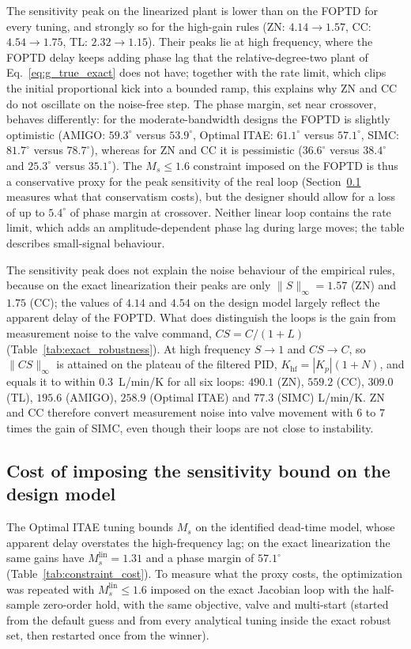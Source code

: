 The sensitivity peak on the linearized plant is lower than on the FOPTD for every tuning, and strongly so for the high-gain rules (ZN: $4.14 \rightarrow 1.57$, CC: $4.54 \rightarrow 1.75$, TL: $2.32 \rightarrow 1.15$). Their peaks lie at high frequency, where the FOPTD delay keeps adding phase lag that the relative-degree-two plant of Eq.~\eqref{eq:g_true_exact} does not have; together with the rate limit, which clips the initial proportional kick into a bounded ramp, this explains why ZN and CC do not oscillate on the noise-free step. The phase margin, set near crossover, behaves differently: for the moderate-bandwidth designs the FOPTD is slightly optimistic (AMIGO: $59.3^\circ$ versus $53.9^\circ$, Optimal ITAE: $61.1^\circ$ versus $57.1^\circ$, SIMC: $81.7^\circ$ versus $78.7^\circ$), whereas for ZN and CC it is pessimistic ($36.6^\circ$ versus $38.4^\circ$ and $25.3^\circ$ versus $35.1^\circ$). The $M_s \le 1.6$ constraint imposed on the FOPTD is thus a conservative proxy for the peak sensitivity of the real loop (Section~\ref{subsec:constraint_cost} measures what that conservatism costs), but the designer should allow for a loss of up to $5.4^\circ$ of phase margin at crossover. Neither linear loop contains the rate limit, which adds an amplitude-dependent phase lag during large moves; the table describes small-signal behaviour.



The sensitivity peak does not explain the noise behaviour of the empirical rules, because on the exact linearization their peaks are only $\|S\|_\infty = 1.57$ (ZN) and $1.75$ (CC); the values of $4.14$ and $4.54$ on the design model largely reflect the apparent delay of the FOPTD. What does distinguish the loops is the gain from measurement noise to the valve command, $CS = C/(1+L)$ (Table~\ref{tab:exact_robustness}). At high frequency $S \to 1$ and $CS \to C$, so $\|CS\|_\infty$ is attained on the plateau of the filtered PID, $K_{\mathrm{hf}} = |K_p|(1+N)$, and equals it to within $0.3$~L/min/K for all six loops: $490.1$ (ZN), $559.2$ (CC), $309.0$ (TL), $195.6$ (AMIGO), $258.9$ (Optimal ITAE) and $77.3$ (SIMC) L/min/K. ZN and CC therefore convert measurement noise into valve movement with $6$ to $7$ times the gain of SIMC, even though their loops are not close to instability.

\subsection{Cost of imposing the sensitivity bound on the design model}
\label{subsec:constraint_cost}
The Optimal ITAE tuning bounds $M_s$ on the identified dead-time model, whose apparent delay overstates the high-frequency lag; on the exact linearization the same gains have $M_s^{\mathrm{lin}} = 1.31$ and a phase margin of $57.1^\circ$ (Table~\ref{tab:constraint_cost}). To measure what the proxy costs, the optimization was repeated with $M_s^{\mathrm{lin}} \le 1.6$ imposed on the exact Jacobian loop with the half-sample zero-order hold, with the same objective, valve and multi-start (started from the default guess and from every analytical tuning inside the exact robust set, then restarted once from the winner).

